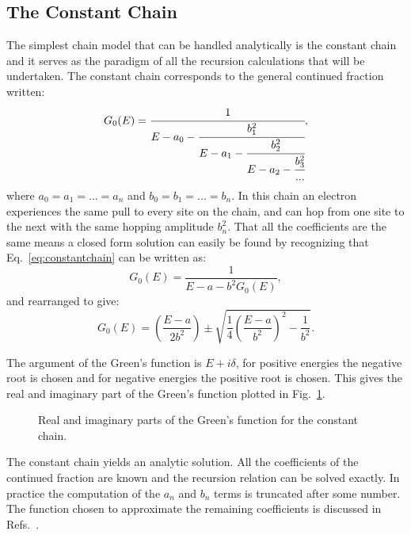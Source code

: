 \subsection{The Constant Chain}
The simplest chain model that can be handled analytically is the constant chain and it
serves as the paradigm of all the recursion calculations that will be undertaken. 
The constant chain corresponds to the general continued fraction written:
%
\begin{equation}
\label{eq:constantchain}
G_{0}(E) = \cfrac{1}{E-a_{0}-\cfrac{b_{1}^2}{E-a_{1}-\cfrac{b_{2}^{2}}{E-a_{2}-\cfrac{b_{3}^{2}}{...}}}},
\end{equation}
%
where $a_{0}=a_{1}=...=a_{n}$ and $b_{0}=b_{1}=...=b_{n}$. 
%
In this chain an electron experiences the same pull to 
every site on the chain, and can hop from one site to 
the next with the same hopping amplitude $b^{2}_{n}$. 
%
That all the coefficients are the same means a closed 
form solution can easily be found by recognizing that 
Eq.~\ref{eq:constantchain} can be written as:
%
\begin{equation}
G_{0}(E) = \frac{1}{E-a-b^{2}G_{0}(E)},
\end{equation}
%
and rearranged to give:
%
\begin{equation}
G_{0}(E) = (\frac{E-a}{2b^{2}}) \pm \sqrt{\frac{1}{4}(\frac{E-a}{b^{2}})^{2} - \frac{1}{b^{2}}}.
\end{equation}

The argument of the Green's function is $E + i\delta$, for positive 
energies the negative root is chosen and for negative energies 
the positive root is chosen. This gives the real
and imaginary part of the Green's function plotted 
in Fig.~\ref{fig:gfconstchain}.
%
\begin{figure}
\begin{center}
{\graphicspath{{./invariance/chain_figs/}}}
\caption{Real and imaginary parts of the Green's function for the constant chain.\label{fig:gfconstchain}}
\end{center}
\end{figure}
%
The constant chain yields an analytic solution. All the coefficients of the continued
fraction are known and the recursion relation can be solved exactly. In practice
the computation of the $a_{n}$ and $b_{n}$ terms is truncated after some number.
The function chosen to approximate the remaining coefficients is discussed in
Refs.~\cite{haydock84, haydock85}.

